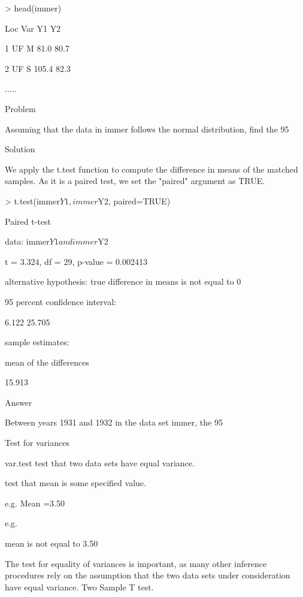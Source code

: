 > head(immer) 

 Loc Var    Y1    Y2 

1  UF   M  81.0  80.7 

2  UF   S 105.4  82.3 

   .....

Problem

Assuming that the data in immer follows the normal distribution, find the 95%

Solution

We apply the t.test function to compute the difference in means of the matched samples. As it is a paired test, we set the "paired" argument as TRUE.

> t.test(immer$Y1, immer$Y2, paired=TRUE) 



          Paired t-test 



data:  immer$Y1 and immer$Y2 

t = 3.324, df = 29, p-value = 0.002413 

alternative hypothesis: true difference in means is not equal to 0 

95 percent confidence interval: 

 6.122 25.705 

sample estimates: 

mean of the differences 

                15.913

Answer

Between years 1931 and 1932 in the data set immer, the 95%




Test for variances


var.test test that two data sets have equal variance.


test that mean is some specified value. 


e.g. Mean =3.50

e.g. 

mean is not equal to 3.50 


The test for equality of variances is important, as many other inference procedures rely on the assumption that the two data sets under consideration have equal variance. Two Sample T test.



